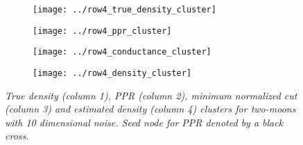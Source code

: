 \begin{figure}
	\centering
	\begin{adjustbox}{minipage=\linewidth,scale=0.8}
		\begin{subfigure}{.24\linewidth}
			\texttt{[image: ../row4\_true\_density\_cluster]}
			\caption{}
		\end{subfigure}
		\begin{subfigure}{.24\linewidth}
			\texttt{[image: ../row4\_ppr\_cluster]}
			\caption{}
		\end{subfigure}
		\begin{subfigure}{.24\linewidth}
			\texttt{[image: ../row4\_conductance\_cluster]}
			\caption{}
		\end{subfigure}
		\begin{subfigure}{.24\linewidth}
			\texttt{[image: ../row4\_density\_cluster]}
			\caption{}
		\end{subfigure}
		\caption{\it\small True density (column 1), PPR (column 2), minimum normalized
			cut (column 3) and estimated density (column 4) clusters for two-moons with 10 dimensional noise. Seed node for PPR denoted by a black cross.} 
		\label{fig:moons_hd}
	\end{adjustbox}
\end{figure}